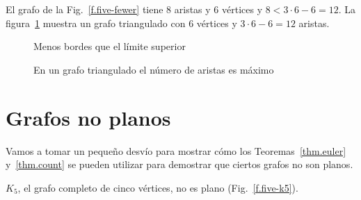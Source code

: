 \begin{example}
El grafo de la Fig.~\ref{f.five-fewer} tiene $8$ aristas y $6$ vértices y $8< 3\cdot 6 - 6= 12$.
La figura~\ref{f.five-upper-limit} muestra un grafo triangulado con $6$ vértices y $3\cdot 6 - 6= 12$ aristas.
\end{example}

\begin{figure}[t]
\begin{minipage}{.4\textwidth}
\begin{center}
\caption{Menos bordes que el límite superior}\label{f.five-fewer}
\end{center}
\end{minipage}
\hfill
\begin{minipage}{.55\textwidth}
\begin{center}
\caption{En un grafo triangulado el número de aristas es máximo}\label{f.five-upper-limit}
\end{center}
\end{minipage}
\end{figure}


\section{Grafos no planos}\label{s.nonplanar}

Vamos a tomar un pequeño desvío para mostrar cómo los Teoremas~\ref{thm.euler} y~\ref{thm.count} se pueden utilizar para demostrar que ciertos grafos no son planos.

\begin{theorem}
$K_5$, el grafo completo de cinco vértices, no es plano (Fig.~\ref{f.five-k5}).
\end{theorem}

